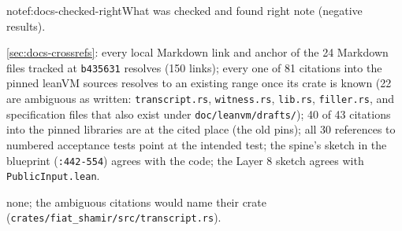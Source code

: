 \begin{finding}{note}{f:docs-checked-right}{What was checked and found right}
 note (negative results).
 \begin{sloppypar}
\cref{sec:docs-crossrefs}: every local Markdown link and anchor of the 24 Markdown files tracked at \texttt{b435631} resolves (150 links); every one of 81 citations into the pinned leanVM sources resolves to an existing range once its crate is known (22 are ambiguous as written: \texttt{transcript.\allowbreak{}rs}, \texttt{witness.\allowbreak{}rs}, \texttt{lib.\allowbreak{}rs}, \texttt{filler.\allowbreak{}rs}, and specification files that also exist under \texttt{doc/\allowbreak{}leanvm/\allowbreak{}drafts/\allowbreak{}}); 40 of 43 citations into the pinned libraries are at the cited place (the old pins); all 30 references to numbered acceptance tests point at the intended test; the spine's sketch in the blueprint (\texttt{:\allowbreak{}442-\allowbreak{}554}) agrees with the code; the Layer 8 sketch agrees with \texttt{Public\allowbreak{}Input.\allowbreak{}lean}.
\end{sloppypar}
 none; the ambiguous citations would name their crate (\texttt{crates/\allowbreak{}fiat\_\allowbreak{}shamir/\allowbreak{}src/\allowbreak{}transcript.\allowbreak{}rs}).
\end{finding}
